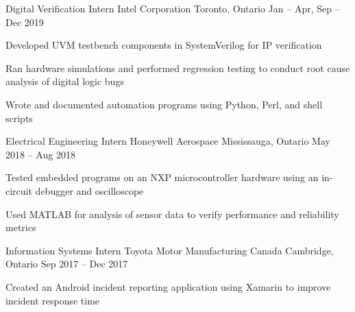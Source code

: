 

\begin{cventries}

  \cventry
    {Digital Verification Intern} %
    {Intel Corporation} %
    {Toronto, Ontario} %
    {Jan -- Apr, Sep -- Dec 2019} %
    {
      \begin{cvitems} %
        \item {Developed UVM testbench components in SystemVerilog for IP verification}
        \item {Ran hardware simulations and performed regression testing to conduct root cause analysis of digital logic bugs}
        \item {Wrote and documented automation programs using Python, Perl, and shell scripts}
      \end{cvitems}
    }

  \cventry
    {Electrical Engineering Intern} %
    {Honeywell Aerospace} %
    {Mississauga, Ontario} %
    {May 2018 -- Aug 2018} %
    {
      \begin{cvitems} %
        \item {Tested embedded programs on an NXP microcontroller hardware using an in-circuit debugger and oscilloscope}
        \item {Used MATLAB for analysis of sensor data to verify performance and reliability metrics}
      \end{cvitems}
    }

  \cventry
    {Information Systems Intern} %
    {Toyota Motor Manufacturing Canada} %
    {Cambridge, Ontario} %
    {Sep 2017 -- Dec 2017} %
    {
      \begin{cvitems} %
        \item {Created an Android incident reporting application using Xamarin to improve incident response time}
      \end{cvitems}
    }


\end{cventries}

